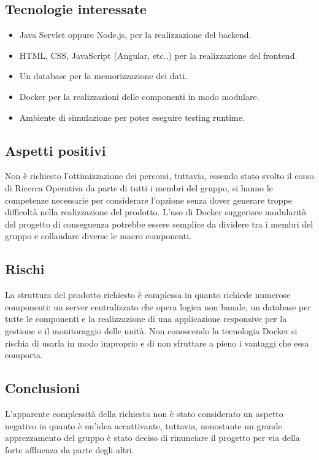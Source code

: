 \documentclass[../studio-di-fattibilita.tex]{subfiles}
\begin{document}
\subsection{Tecnologie interessate}%
\label{sub:c5_tecnologie_interessate}
\begin{itemize}
  \item Java Servlet oppure Node.js, per la realizzazione del backend.
  \item HTML, CSS, JavaScript (Angular, etc..) per la realizzazione del frontend.
  \item Un database per la memorizzazione dei dati.
  \item Docker per la realizzazioni delle componenti in modo modulare.
  \item Ambiente di simulazione per poter eseguire testing runtime. 
\end{itemize}

\subsection{Aspetti positivi}%
\label{sub:c5_aspetti_positivi}
Non è richiesto l’ottimizzazione dei percorsi, tuttavia, essendo stato svolto il corso di Ricerca Operativa da parte di tutti i membri del gruppo, si hanno le competenze necessarie per considerare l’opzione senza dover generare troppe difficoltà nella realizzazione del prodotto. 
L’uso di Docker suggerisce modularità del progetto di conseguenza potrebbe essere semplice da dividere tra i membri del gruppo e collaudare diverse le macro componenti. 

\subsection{Rischi}%
\label{sub:c5_rischi}
La struttura del prodotto richiesto è complessa in quanto richiede numerose componenti: un server centralizzato che opera logica non banale, un database per tutte le componenti e la realizzazione di una applicazione responsive per la gestione e il monitoraggio delle unità.
Non conoscendo la tecnologia Docker si rischia di usarla in modo improprio e di non sfruttare a pieno i vantaggi che essa comporta.

\subsection{Conclusioni}%
\label{sub:c5_conclusioni}
L'apparente complessità della richiesta non è stato considerato un aspetto negativo in quanto è un’idea accattivante, tuttavia, nonostante un grande apprezzamento del gruppo è stato deciso di rinunciare il progetto per via della forte affluenza da parte degli altri.
\end{document}
